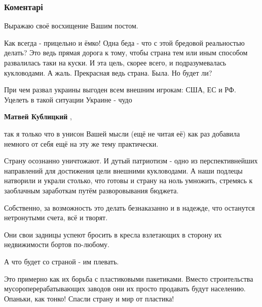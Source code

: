  
 
 
 
 
\subsubsection{Коментарі}
\label{sec:11_12_2021.fb.lesev_igor.1.strategia_pustota.cmt}

\begin{itemize} %
Выражаю своё восхищение Вашим постом.

Как всегда - прицельно и ёмко!
Одна беда - что с этой бредовой реальностью делать?
Это ведь прямая дорога к тому, чтобы страна тем или иным способом развалилась таки на куски. И эта цель, скорее всего, и подразумевалась кукловодами.
А жаль.
Прекрасная ведь страна. Была. Но будет ли?

\begin{itemize} %
При чем развал украины выгоден всем внешним игрокам: США, ЕС и РФ. Уцелеть в такой ситуации Украине - чудо

\textbf{Матвей Кублицкий} , 

так я только что в унисон Вашей мысли (ещё не читая её) как раз добавила
немного от себя ещё на эту же тему практически.

Страну осознанно уничтожают. И дутый патриотизм - одно из перспективнейших
направлений для достижения цели внешними кукловодами. А наши подлецы натворили
и украли столько, что готовы и страну на ноль умножить, стремясь к заоблачным
заработкам путём разворовывания бюджета.

Собственно, за возможность это делать безнаказанно и в надежде, что останутся
нетронутыми счета, всё и творят.

Они свои задницы успеют бросить в кресла взлетающих в сторону их недвижимости
бортов по-любому.

А что будет со страной - им плевать.

Это примерно как их борьба с пластиковыми пакетиками. Вместо строительства
мусороперерабатывающих заводов они их просто продавать будут населению.
Опаньки, как тонко! Спасли страну и мир от пластика!


\end{itemize}
\end{itemize}
